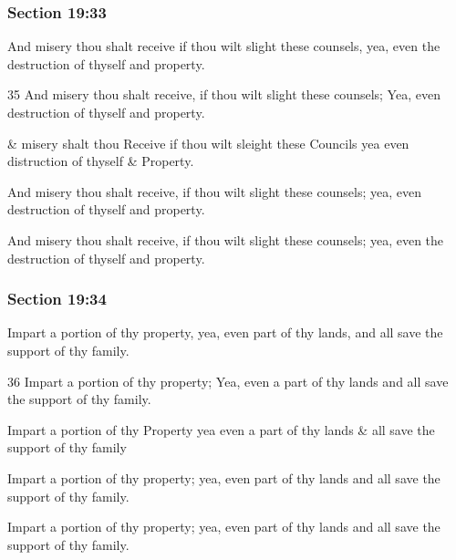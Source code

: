 	\subsubsection{Section 19:33} %
		\label{DC19-33}

		And misery thou shalt receive if thou wilt slight these counsels, yea, even the destruction of thyself and property.

		\begin{framed}
		\scriptsize
			\begin{compactdesc}
				\item[JSP] 35 And misery thou shalt receive, if thou wilt slight these counsels; Yea, even destruction of thyself and property.
				\item[RB1] \& misery shalt thou Receive if thou wilt sleight these Councils yea even distruction of thyself \& Property.
				\item[DC 1835] And misery thou shalt receive, if thou wilt slight these counsels; yea, even destruction of thyself and property. 
				\item[DC 1844] And misery thou shalt receive, if thou wilt slight these counsels; yea, even the destruction of thyself and property. 
			\end{compactdesc}
		\end{framed}

	\subsubsection{Section 19:34} %
		\label{DC19-34}

		Impart a portion of thy property, yea, even part of thy lands, and all save the support of thy family.

		\begin{framed}
		\scriptsize
			\begin{compactdesc}
				\item[JSP] 36 Impart a portion of thy property; Yea, even a part of thy lands and all save the support of thy family.
				\item[RB1] Impart a portion of thy Property yea even a part of thy lands \& all save the support of thy family
				\item[DC 1835] Impart a portion of thy property; yea, even part of thy lands and all save the support of thy family. 
				\item[DC 1844] Impart a portion of thy property; yea, even part of thy lands and all save the support of thy family. 
			\end{compactdesc}
		\end{framed}

